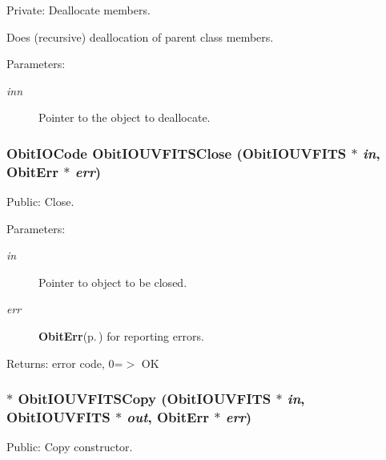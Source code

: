 Private: Deallocate members. 

Does (recursive) deallocation of parent class members. \begin{Desc}
\item[Parameters:]
\begin{description}
\item[{\em inn}]Pointer to the object to deallocate. \end{description}
\end{Desc}
\subsubsection{\setlength{\rightskip}{0pt plus 5cm}Obit\-IOCode Obit\-IOUVFITSClose ({\bf Obit\-IOUVFITS} $\ast$ {\em in}, {\bf Obit\-Err} $\ast$ {\em err})}\label{ObitIOUVFITS_8c_a25}


Public: Close. 

\begin{Desc}
\item[Parameters:]
\begin{description}
\item[{\em in}]Pointer to object to be closed. \item[{\em err}]{\bf Obit\-Err}{\rm (p.\,\pageref{structObitErr})} for reporting errors. \end{description}
\end{Desc}
\begin{Desc}
\item[Returns:]error code, 0=$>$ OK \end{Desc}
\subsubsection{$\ast$ Obit\-IOUVFITSCopy ({\bf Obit\-IOUVFITS} $\ast$ {\em in}, {\bf Obit\-IOUVFITS} $\ast$ {\em out}, {\bf Obit\-Err} $\ast$ {\em err})}\label{ObitIOUVFITS_8c_a23}


Public: Copy constructor. 

